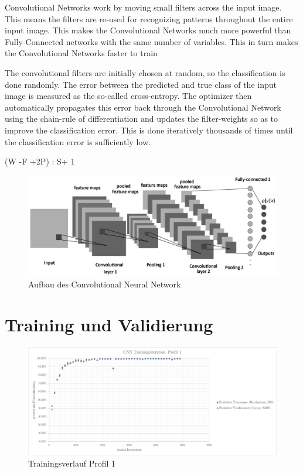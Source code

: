 Convolutional Networks work by moving small filters across the input image. This means the filters are re-used for recognizing patterns throughout the entire input image. This makes the Convolutional Networks much more powerful than Fully-Connected networks with the same number of variables. This in turn makes the Convolutional Networks faster to train




The convolutional filters are initially chosen at random, so the classification is done randomly. The error between the predicted and true class of the input image is measured as the so-called cross-entropy. The optimizer then automatically propagates this error back through the Convolutional Network using the chain-rule of differentiation and updates the filter-weights so as to improve the classification error. This is done iteratively thousands of times until the classification error is sufficiently low.


(W -F +2P) : S+ 1



\begin{figure}[H]
	\centering
	\includegraphics[width=1\textwidth]
	{fig/CCN.png}
	\caption[Aufbau des Convolutional Neural Network]{Aufbau des Convolutional Neural Network}
	\label{fig:CCN}
\end{figure}




\section{Training und Validierung}




\begin{figure}[H]
	\centering
	\caption{Trainingsverlauf Profil 1}
	\label{fig:traininsverlauf}
	\includegraphics[width=1.0\linewidth]{fig/Traininsverlauf}
\end{figure}



